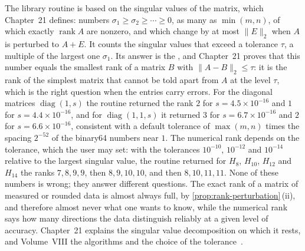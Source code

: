 The library routine is based on the singular values of the matrix, which Chapter~21 defines: numbers $\sigma_1\ge\sigma_2\ge\cdots\ge0$, as many as $\min(m,n)$, of which exactly $\operatorname{rank}A$ are nonzero, and which change by at most $\|E\|_2$ when $A$ is perturbed to $A+E$. It counts the singular values that exceed a tolerance $\tau$, a multiple of the largest one $\sigma_1$. Its answer is the , and Chapter~21 proves that this number equals the smallest rank of a matrix $B$ with $\|A-B\|_2\le\tau$: it is the rank of the simplest matrix that cannot be told apart from $A$ at the level $\tau$, which is the right question when the entries carry errors. For the diagonal matrices $\operatorname{diag}(1,s)$ the routine returned the rank $2$ for $s=4.5\times10^{-16}$ and $1$ for $s=4.4\times10^{-16}$, and for $\operatorname{diag}(1,1,s)$ it returned $3$ for $s=6.7\times10^{-16}$ and $2$ for $s=6.6\times10^{-16}$, consistent with a default tolerance of $\max(m,n)$ times the spacing $2^{-52}$ of the binary64 numbers near $1$. The numerical rank depends on the tolerance, which the user may set: with the tolerances $10^{-10}$, $10^{-12}$ and $10^{-14}$ relative to the largest singular value, the routine returned for $H_8$, $H_{10}$, $H_{12}$ and $H_{14}$ the ranks $7,8,9,9$, then $8,9,10,10$, and then $8,10,11,11$. None of these numbers is wrong; they answer different questions. The exact rank of a matrix of measured or rounded data is almost always full, by \cref{prop:rank-perturbation}\,(ii), and therefore almost never what one wants to know, while the numerical rank says how many directions the data distinguish reliably at a given level of accuracy. Chapter~21 explains the singular value decomposition on which it rests, and Volume~VIII the algorithms and the choice of the tolerance~\cite{golub2013}.

